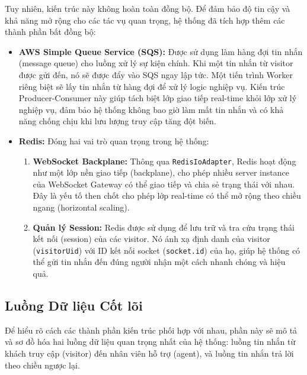 Tuy nhiên, kiến trúc này không hoàn toàn đồng bộ. Để đảm bảo độ tin cậy và khả năng mở rộng cho các tác vụ quan trọng, hệ thống đã tích hợp thêm các thành phần bất đồng bộ:
\begin{itemize}
    \item \textbf{AWS Simple Queue Service (SQS):} Được sử dụng làm hàng đợi tin nhắn (message queue) cho luồng xử lý sự kiện chính. Khi một tin nhắn từ visitor được gửi đến, nó sẽ được đẩy vào SQS ngay lập tức. Một tiến trình Worker riêng biệt sẽ lấy tin nhắn từ hàng đợi để xử lý logic nghiệp vụ. Kiến trúc Producer-Consumer này giúp tách biệt lớp giao tiếp real-time khỏi lớp xử lý nghiệp vụ, đảm bảo hệ thống không bao giờ làm mất tin nhắn và có khả năng chống chịu khi lưu lượng truy cập tăng đột biến.
    
    \item \textbf{Redis:} Đóng hai vai trò quan trọng trong hệ thống:
    \begin{enumerate}
        
        \item 
        \begin{sloppypar}
            \textbf{WebSocket Backplane:} Thông qua \texttt{RedisIoAdapter}, Redis hoạt động như một lớp nền giao tiếp (backplane), cho phép nhiều server instance của WebSocket Gateway có thể giao tiếp và chia sẻ trạng thái với nhau. Đây là yếu tố then chốt cho phép lớp real-time có thể mở rộng theo chiều ngang (horizontal scaling).
        \end{sloppypar}

        \item \textbf{Quản lý Session:} Redis được sử dụng để lưu trữ và tra cứu trạng thái kết nối (session) của các visitor. Nó ánh xạ định danh của visitor (\texttt{visitorUid}) với ID kết nối socket (\texttt{socket.id}) của họ, giúp hệ thống có thể gửi tin nhắn đến đúng người nhận một cách nhanh chóng và hiệu quả.
    \end{enumerate}
\end{itemize}
\subsection{Luồng Dữ liệu Cốt lõi}
\label{subsec:luong-du-lieu-cot-loi}

Để hiểu rõ cách các thành phần kiến trúc phối hợp với nhau, phần này sẽ mô tả và sơ đồ hóa hai luồng dữ liệu quan trọng nhất của hệ thống: luồng tin nhắn từ khách truy cập (visitor) đến nhân viên hỗ trợ (agent), và luồng tin nhắn trả lời theo chiều ngược lại.

